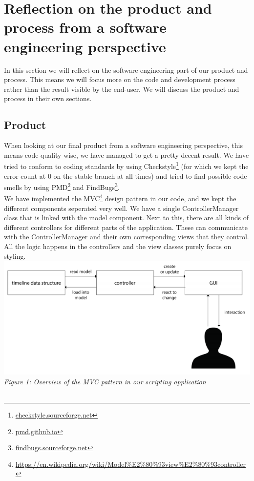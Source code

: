 \section{Reflection on the product and process from a software engineering perspective}

In this section we will reflect on the software engineering part of our product and process. This means we will focus more on the code and development process rather than the result visible by the end-user. We will discuss the product and process in their own sections.

\subsection{Product}
When looking at our final product from a software engineering perspective, this means code-quality wise, we have managed to get a pretty decent result. We have tried to conform to coding standards by using Checkstyle\footnote{\url{checkstyle.sourceforge.net}} (for which we kept the error count at 0 on the stable branch at all times) and tried to find possible code smells by using PMD\footnote{\url{pmd.github.io}} and FindBugs\footnote{\url{findbugs.sourceforge.net}}.\\
We have implemented the MVC\footnote{\url{https://en.wikipedia.org/wiki/Model\%E2\%80\%93view\%E2\%80\%93controller}} design pattern in our code, and we kept the different components seperated very well. We have a single ControllerManager class that is linked with the model component. Next to this, there are all kinds of different controllers for different parts of the application. These can communicate with the ControllerManager and their own corresponding views that they control. All the logic happens in the controllers and the view classes purely focus on styling.\\
\includegraphics[scale=1]{./images/mvc}\\
\textit{Figure 1: Overview of the MVC pattern in our scripting application}\\\\
